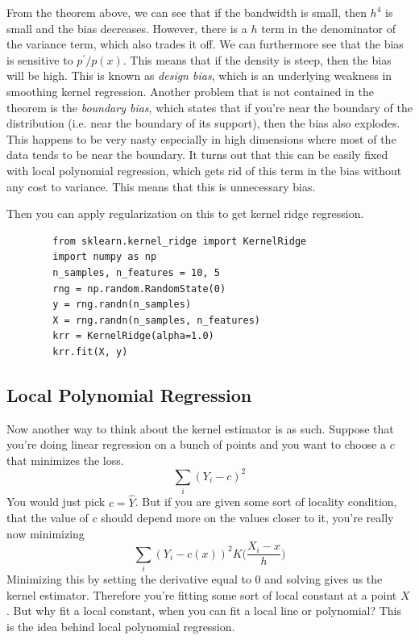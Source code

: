 \documentclass{article}
\begin{document}
    From the theorem above, we can see that if the bandwidth is small, then $h^4$ is small and the bias decreases. However, there is a $h$ term in the denominator of the variance term, which also trades it off. We can furthermore see that the bias is sensitive to $p^\prime / p(x)$. This means that if the density is steep, then the bias will be high. This is known as \textit{design bias}, which is an underlying weakness in smoothing kernel regression. Another problem that is not contained in the theorem is the \textit{boundary bias}, which states that if you're near the boundary of the distribution (i.e. near the boundary of its support), then the bias also explodes. This happens to be very nasty especially in high dimensions where most of the data tends to be near the boundary. It turns out that this can be easily fixed with local polynomial regression, which gets rid of this term in the bias without any cost to variance. This means that this is unnecessary bias. 

    Then you can apply regularization on this to get kernel ridge regression. 

    \begin{code}
      \begin{lstlisting}
        from sklearn.kernel_ridge import KernelRidge
        import numpy as np
        n_samples, n_features = 10, 5
        rng = np.random.RandomState(0)
        y = rng.randn(n_samples)
        X = rng.randn(n_samples, n_features)
        krr = KernelRidge(alpha=1.0)
        krr.fit(X, y)
      \end{lstlisting}
    \end{code}

  \subsection{Local Polynomial Regression}

    Now another way to think about the kernel estimator is as such. Suppose that you're doing linear regression on a bunch of points and you want to choose a $c$ that minimizes the loss. 
    \begin{equation}
      \sum_i (Y_i - c)^2
    \end{equation}
    You would just pick $c = \hat{Y}$. But if you are given some sort of locality condition, that the value of $c$ should depend more on the values closer to it, you're really now minimizing 
    \begin{equation}
      \sum_i (Y_i - c(x))^2 K \bigg( \frac{X_i - x}{h} \bigg)
    \end{equation}
    Minimizing this by setting the derivative equal to $0$ and solving gives us the kernel estimator. Therefore you're fitting some sort of local constant at a point $X$. But why fit a local constant, when you can fit a local line or polynomial? This is the idea behind local polynomial regression.
\end{document}
